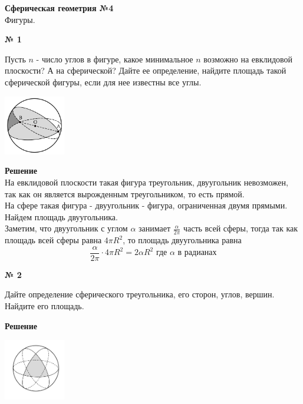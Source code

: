 


    \begin{center}
        \textbf{Сферическая геометрия №4}\\
        Фигуры.
    \end{center}


    \begin{center}
        \textbf{№ 1}
    \end{center}
    Пусть $n$ - число углов в фигуре, какое минимальное $n$ возможно на евклидовой плоскости?
    А на сферической?
    Дайте ее определение, найдите площадь такой сферической фигуры, если для нее известны все углы.

    \begin{center}
        \includegraphics[width=0.2\textwidth]{images/Frame 52}\\
    \end{center}
    \textbf{Решение}\\
    На евклидовой плоскости такая фигура треугольник,
    двуугольник невозможен, так как он является вырожденным треугольником, то есть прямой.\\

    На сфере такая фигура - двуугольник - фигура, ограниченная двумя прямыми.\\

    Найдем площадь двуугольника.\\
    Заметим, что двуугольник с углом $\alpha$ занимает $\frac{\alpha}{2\pi}$ часть всей сферы,
    тогда так как площадь всей сферы равна $4\pi R^2$, то площадь двуугольника равна
    \[
        \frac{\alpha}{2\pi}\cdot 4\pi R^2 = 2\alpha R^2\text{ где $\alpha$ в радианах}
    \]

    \begin{center}
        \textbf{№ 2}
    \end{center}
    Дайте определение сферического треугольника, его сторон, углов, вершин.
    Найдите его площадь.

    \textbf{Решение}\\
    \begin{center}
        \includegraphics[width=0.2\textwidth]{images/Frame 23}\\
    \end{center}

